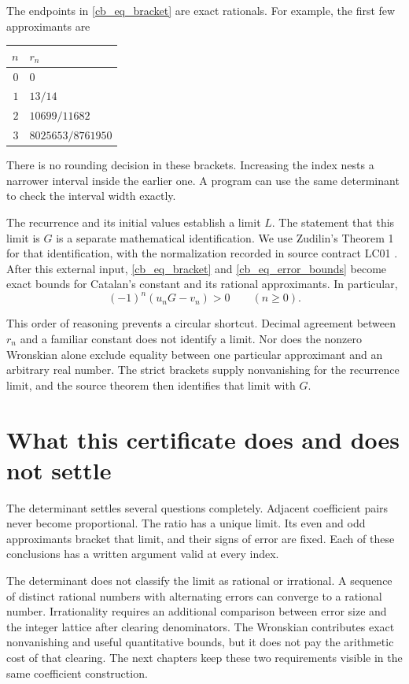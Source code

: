 The endpoints in \eqref{cb_eq_bracket} are exact rationals. For example,
the first few approximants are
\begin{center}
\begin{tabular}{@{}rl@{}}
\toprule
$n$ & $r_n$\\
\midrule
$0$ & $0$\\
$1$ & $13/14$\\
$2$ & $10699/11682$\\
$3$ & $8025653/8761950$\\
\bottomrule
\end{tabular}
\end{center}
There is no rounding decision in these brackets. Increasing the index
nests a narrower interval inside the earlier one. A program can use the
same determinant to check the interval width exactly.

The recurrence and its initial values establish a limit $L$. The statement
that this limit is $G$ is a separate mathematical identification. We use
Zudilin's Theorem 1 for that identification, with the normalization recorded
in source contract LC01 \cite{Zudilin2003}. After this external input,
\eqref{cb_eq_bracket} and \eqref{cb_eq_error_bounds} become exact bounds for
Catalan's constant and its rational approximants. In particular,
\begin{equation}\label{cb_eq_linear_error_sign}
 (-1)^n(u_nG-v_n)>0\qquad(n\geq0).
\end{equation}

This order of reasoning prevents a circular shortcut. Decimal agreement
between $r_n$ and a familiar constant does not identify a limit. Nor does
the nonzero Wronskian alone exclude equality between one particular
approximant and an arbitrary real number. The strict brackets supply
nonvanishing for the recurrence limit, and the source theorem then identifies
that limit with $G$.

\section{What this certificate does and does not settle}

The determinant settles several questions completely. Adjacent coefficient
pairs never become proportional. The ratio has a unique limit. Its even and
odd approximants bracket that limit, and their signs of error are fixed.
Each of these conclusions has a written argument valid at every index.

The determinant does not classify the limit as rational or irrational. A
sequence of distinct rational numbers with alternating errors can converge
to a rational number. Irrationality requires an additional comparison
between error size and the integer lattice after clearing denominators.
The Wronskian contributes exact nonvanishing and useful quantitative bounds,
but it does not pay the arithmetic cost of that clearing. The next chapters
keep these two requirements visible in the same coefficient construction.

